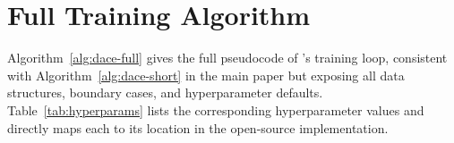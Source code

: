 
\section{Full \method Training Algorithm}
\label{apdx:algorithm}

Algorithm~\ref{alg:dace-full} gives the full pseudocode of \method's training loop, consistent with Algorithm~\ref{alg:dace-short} in the main paper but exposing all data structures, boundary cases, and hyperparameter defaults. Table~\ref{tab:hyperparams} lists the corresponding hyperparameter values and directly maps each to its location in the open-source implementation.

